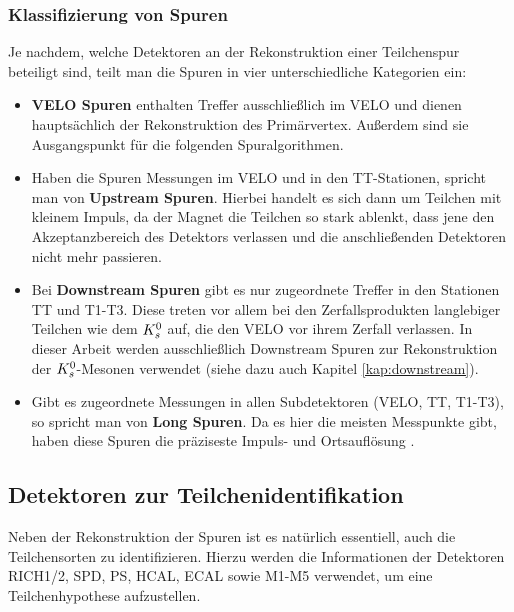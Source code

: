 \subsubsection{Klassifizierung von Spuren} \label{kap:spurklassen}
Je nachdem, welche Detektoren an der Rekonstruktion einer Teilchenspur beteiligt sind, teilt man die Spuren in vier unterschiedliche Kategorien ein:
\begin{itemize}
\item \textbf{VELO Spuren} enthalten Treffer ausschließlich im VELO und dienen hauptsächlich der Rekonstruktion des Primärvertex. Außerdem sind sie Ausgangspunkt für die folgenden Spuralgorithmen.
\item Haben die Spuren Messungen im VELO und in den TT-Stationen, spricht man von \textbf{Upstream Spuren}. Hierbei handelt es sich dann um Teilchen mit kleinem Impuls, da der Magnet die Teilchen so stark ablenkt, dass jene den Akzeptanzbereich des Detektors verlassen und die anschließenden Detektoren nicht mehr passieren.
\item Bei \textbf{Downstream Spuren} gibt es nur zugeordnete Treffer in den Stationen TT und T1-T3. Diese treten vor allem bei den Zerfallsprodukten langlebiger Teilchen wie dem $K_s^0$ auf, die den VELO vor ihrem Zerfall verlassen. In dieser Arbeit werden ausschließlich Downstream Spuren zur Rekonstruktion der $K_s^0$-Mesonen verwendet (siehe dazu auch Kapitel \ref{kap:downstream}).
\item Gibt es zugeordnete Messungen in allen Subdetektoren (VELO, TT, T1-T3), so spricht man von \textbf{Long Spuren}. Da es hier die meisten Messpunkte gibt, haben diese Spuren die präziseste Impuls- und Ortsauflösung \cite{thesis_linn}.
\end{itemize}

\subsection{Detektoren zur Teilchenidentifikation}
Neben der Rekonstruktion der Spuren ist es natürlich essentiell, auch die Teilchensorten zu identifizieren. Hierzu werden die Informationen der Detektoren RICH1/2, SPD, PS, HCAL, ECAL sowie M1-M5 verwendet, um eine Teilchenhypothese aufzustellen.

